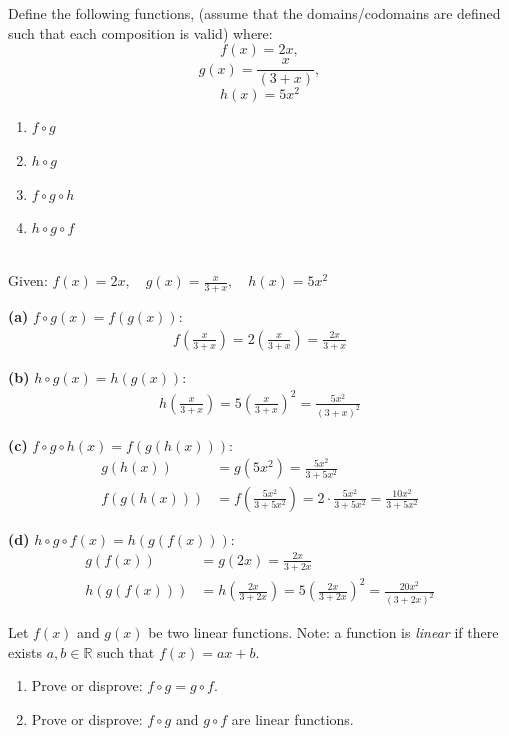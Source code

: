 \documentclass[10pt]{exam}
\begin{document}
\begin{questions}
\begin{solution}
\end{solution}

\question[8] Define the following functions, (assume that the
domains/codomains are defined such that each composition is valid) where:
$$f(x) = 2x, $$$$g(x) = \frac{x}{(3+x)},$$$$ h(x) = 5x^2$$
\begin{enumerate} [label=(\alph*)]
 \item $f\circ g $
 \item $h\circ g $
 \item $f\circ g \circ h$
 \item $h \circ g \circ f$
\end{enumerate}

\begin{solution}\\
    Given:
    $f(x) = 2x, \quad g(x) = \frac{x}{3+x}, \quad h(x) = 5x^2$
    
    \textbf{(a)} $f \circ g(x) = f(g(x))$:
    \begin{align*}
    f\left(\frac{x}{3+x}\right) = 2(\frac{x}{3+x}) = \boxed{\frac{2x}{3+x}}
    \end{align*}
    
    \textbf{(b)} $h \circ g(x) = h(g(x))$:
    \begin{align*}
    h\left(\frac{x}{3+x}\right) = 5\left(\frac{x}{3+x}\right)^2 = \boxed{\frac{5x^2}{(3+x)^2}}
    \end{align*}
    
    \textbf{(c)} $f \circ g \circ h(x) = f(g(h(x)))$:
    \begin{align*}
    g(h(x)) &= g(5x^2) = \frac{5x^2}{3+5x^2} \\[8pt]
    f(g(h(x))) &= f\left(\frac{5x^2}{3+5x^2}\right) = 2 \cdot \frac{5x^2}{3+5x^2} = \boxed{\frac{10x^2}{3+5x^2}}
    \end{align*}
    
    \textbf{(d)} $h \circ g \circ f(x) = h(g(f(x)))$:
    \begin{align*}
    g(f(x)) &= g(2x) = \frac{2x}{3+2x} \\[8pt] 
    h(g(f(x))) &= h\left(\frac{2x}{3+2x}\right) = 5\left(\frac{2x}{3+2x}\right)^2 = \boxed{\frac{20x^2}{(3+2x)^2}}
    \end{align*}
\end{solution}

\question[6] Let $f(x)$ and $g(x)$ be two linear functions. Note: a function is \emph{linear} if there exists $a, b \in \mathbb{R}$ such that $f(x) = ax + b$. 
\begin{enumerate} [label=(\alph*)]
    \item Prove or disprove: $f\circ g = g\circ f$.
    \item Prove or disprove: $f \circ g$ and $g \circ f$ are linear functions.
\end{enumerate}


\end{questions}
\end{document}
